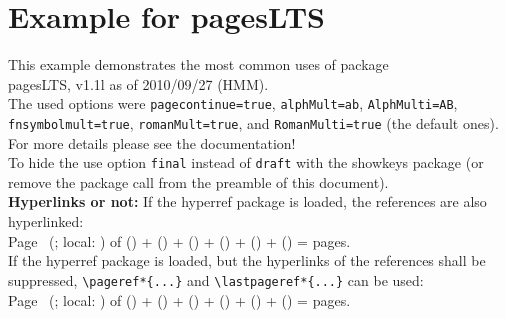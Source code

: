 \documentclass[british]{article}
\begin{document}


\section*{Example for pagesLTS}

This example demonstrates the most common uses of package\\
\textsf{pagesLTS}, v1.1l as of 2010/09/27 (HMM).\\
The used options were \texttt{pagecontinue=true},
\texttt{alphMult=ab}, \texttt{AlphMulti=AB}, \linebreak
\texttt{fnsymbolmult=true},
\texttt{romanMult=true}, and \texttt{RomanMulti=true}
(the default ones).\\
For more details please see the documentation!\\

\label{keys} To hide the \pageref{keys}{\qquad } use option
\texttt{final} instead of \texttt{draft} with the \textsf{showkeys}
package (or remove the package call from the preamble of
this document).\\

\textbf{Hyperlinks or not:} If the \textsf{hyperref} package is loaded,
the references are also hyperlinked:\\
\smallskip
Page \thepage\ (\theCurrentPage; local: \theCurrentPageLocal) of %
() + %
() + %
() + %
() + %
() + %
() = %
 pages.\\
If the \textsf{hyperref} package is loaded, but the hyperlinks of the
references shall be suppressed, \texttt{\textbackslash pageref*\{...\}}
and \texttt{\textbackslash lastpageref*\{...\}} can be used:\\
Page \thepage\ (\theCurrentPage; local: \theCurrentPageLocal) of %
() + %
() + %
() + %
() + %
() + %
() = %
 pages.\\
\end{document}
